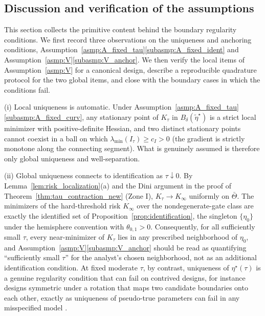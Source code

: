 \documentclass[11pt]{article}
\theoremstyle{definition}
\theoremstyle{plain}
\begin{document}
\subsection{Discussion and verification of the assumptions}\label{sec:pseudo_true_discussion}

This section collects the primitive content behind the boundary regularity conditions. We first record three observations on the uniqueness and anchoring conditions, Assumption~\ref{asmp:A_fixed_tau}\ref{subasmp:A_fixed_ident} and Assumption~\ref{asmp:V}\ref{subasmp:V_anchor}. We then verify the local items of Assumption~\ref{asmp:V} for a canonical design, describe a reproducible quadrature protocol for the two global items, and close with the boundary cases in which the conditions fail.

(i) Local uniqueness is automatic. Under Assumption~\ref{asmp:A_fixed_tau}\ref{subasmp:A_fixed_curv}, any stationary point of $K_\tau$ in $B_\delta(\tilde\eta^\star)$ is a strict local minimizer with positive-definite Hessian, and two distinct stationary points cannot coexist in a ball on which $\lambda_{\min}(I_\tau)\ge c_I>0$ (the gradient is strictly monotone along the connecting segment). What is genuinely assumed is therefore only global uniqueness and well-separation.

(ii) Global uniqueness connects to identification as $\tau\downarrow0$. By Lemma~\ref{lem:risk_localization}(a) and the Dini argument in the proof of Theorem~\ref{thm:tau_contraction_new} (Zone I), $K_\tau\to K_\infty$ uniformly on $\bar\Theta$. The minimizers of the hard-threshold risk $K_\infty$ over the nondegenerate-gate class are exactly the identified set of Proposition~\ref{prop:identification}, the singleton $\{\eta_0\}$ under the hemisphere convention with $\theta_{0,1}>0$. Consequently, for all sufficiently small $\tau$, every near-minimizer of $K_\tau$ lies in any prescribed neighborhood of $\eta_0$, and Assumption~\ref{asmp:V}\ref{subasmp:V_anchor} should be read as quantifying ``sufficiently small $\tau$'' for the analyst's chosen neighborhood, not as an additional identification condition. At fixed moderate $\tau$, by contrast, uniqueness of $\eta^\star(\tau)$ is a genuine regularity condition that can fail on contrived designs, for instance designs symmetric under a rotation that maps two candidate boundaries onto each other, exactly as uniqueness of pseudo-true parameters can fail in any misspecified model \citep{White1982}.
\end{document}
